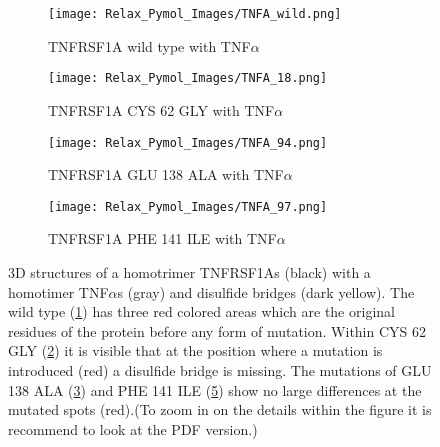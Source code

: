 	\begin{figure}[!ht]
		\centering
		\begin{subfigure}{0.49\textwidth}
			\texttt{[image: Relax\_Pymol\_Images/TNFA\_wild.png]}
			\caption{TNFRSF1A wild type with TNF$\alpha$}
			\label{fig:RES_TNFA_wild}
		\end{subfigure}
		\begin{subfigure}{0.49\textwidth}
			\texttt{[image: Relax\_Pymol\_Images/TNFA\_18.png]}
			\caption{TNFRSF1A CYS 62 GLY with TNF$\alpha$}
			\label{fig:RES_TNFA_18}
		\end{subfigure}
		\par\bigskip
		\begin{subfigure}{0.49\textwidth}
			\texttt{[image: Relax\_Pymol\_Images/TNFA\_94.png]}
			\caption{TNFRSF1A GLU 138 ALA with TNF$\alpha$}
			\label{fig:RES_TNFA_94}
		\end{subfigure}
		\begin{subfigure}{0.49\textwidth}
			\texttt{[image: Relax\_Pymol\_Images/TNFA\_97.png]}
			\caption{TNFRSF1A PHE 141 ILE with TNF$\alpha$}
			\label{fig:RES_TNFA_97}
			\end{subfigure}
		\caption[TNFRSF1A homo trimer with TNF$\alpha$ homo trimers wild type and mutated relaxed models]{3D structures of a homotrimer TNFRSF1As (black) with a homotimer TNF$\alpha$s (gray) and disulfide bridges (dark yellow). The wild type (\ref{fig:RES_TNFA_wild}) has three red colored areas which are the original residues of the protein before any form of mutation. Within CYS 62 GLY (\ref{fig:RES_TNFA_18}) it is visible that at the position where a mutation is introduced (red) a disulfide bridge is missing. The mutations of GLU 138 ALA (\ref{fig:RES_TNFA_94}) and PHE 141 ILE (\ref{fig:RES_TNFA_97}) show no large differences at the mutated spots (red).(To zoom in on the details within the figure it is recommend to look at the PDF version.)}
		\end{figure}
		\newpage
		
